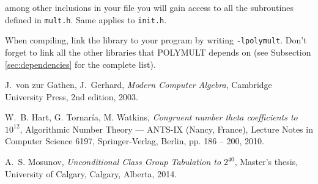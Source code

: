 \documentclass[a4paper,10pt]{article}
\newcommand{\code}{\lstinline}
\begin{document}
among other inclusions in your file you will gain access to all the subroutines defined in \code{mult.h}. Same applies to \code{init.h}.

When compiling, link the library to your program by writing \code{-lpolymult}. Don't forget to link all the other libraries that POLYMULT depends on (see Subsection \ref{sec:dependencies} for the complete list).



\begin{thebibliography}{Koh05}




\normalsize
\baselineskip=17pt

J.\ von zur Gathen, J.\ Gerhard,
\emph{Modern Computer Algebra},
Cambridge University Press, 2nd edition, 2003.

W.~B. Hart, G. Tornar\'ia, M. Watkins,
\emph{Congruent number theta coefficients to $10^{12}$},
Algorithmic Number Theory --- ANTS-IX (Nancy, France), Lecture Notes in Computer Science 6197, Springer-Verlag, Berlin, pp. 186 -- 200,  2010.

A.~S. Mosunov,
\emph{Unconditional Class Group Tabulation to $2^{40}$},
Master's thesis, University of Calgary, Calgary, Alberta, 2014.

\end{thebibliography}
\end{document}
